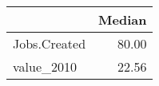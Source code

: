 \begin{table}
\centering
\begin{tabular}[t]{lr}
\toprule
  & Median\\
\midrule
Jobs.Created & 80.00\\
value\_2010 & 22.56\\
\bottomrule
\end{tabular}
\end{table}
